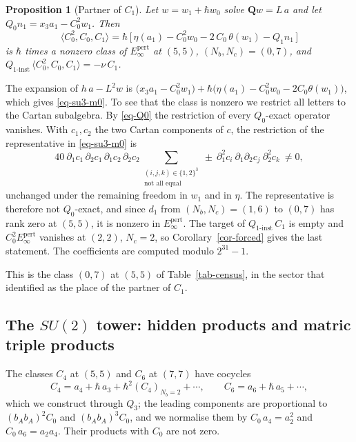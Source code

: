 \documentclass[11pt]{article}
\numberwithin{equation}{section}
\numberwithin{figure}{section}
\numberwithin{table}{section}
\newtheorem{proposition}[theorem]{Proposition}
\theoremstyle{definition}
\newcommand{\Qp}{\mathbf Q}
\newcommand{\Qi}{Q_{1\text{-}\mathrm{inst}}}
\newcommand{\Ep}{E_\infty^{\mathrm{pert}}}
\begin{document}
\begin{proposition}[Partner of $C_1$]\label{prop-C1}
Let $w=w_1+\hbar w_0$ solve $\Qp w=L\,a$ and let $Q_0n_1=x_3a_1-C_0^2w_1$. Then
\begin{equation}\label{eq-su3-m0}
\langle C_0^2,C_0,C_1\rangle=\hbar\,\big[\,\eta(a_1)-C_0^2w_0-2\,C_0\,\theta(w_1)-Q_1n_1\,\big]
\end{equation}
is $\hbar$ times a nonzero class of $\Ep$ at $(5,5)$, $(N_b,N_c)=(0,7)$, and $\Qi\,\langle C_0^2,C_0,C_1\rangle=-\nu\,C_1$.
\end{proposition}

\begin{proofbox}
The expansion of $h\,a-L^2w$ is $\big(x_3a_1-C_0^2w_1\big)+\hbar\big(\eta(a_1)-C_0^2w_0-2C_0\theta(w_1)\big)$, which gives \eqref{eq-su3-m0}. To see that the class is nonzero we restrict all letters to the Cartan subalgebra. By \eqref{eq-Q0} the restriction of every $Q_0$-exact operator vanishes. With $c_1,c_2$ the two Cartan components of $c$, the restriction of the representative in \eqref{eq-su3-m0} is
\begin{equation}\label{eq-su3-cartan}
40\ \partial_1c_1\,\partial_2c_1\,\partial_1c_2\,\partial_2c_2\!\!\sum_{\substack{(i,j,k)\in\{1,2\}^3\\ \text{not all equal}}}\!\!\pm\ \partial_1^2c_i\ \partial_1\partial_2c_j\ \partial_2^2c_k\ \neq0 ,
\end{equation}
unchanged under the remaining freedom in $w_1$ and in $\eta$. The representative is therefore not $Q_0$-exact, and since $d_1$ from $(N_b,N_c)=(1,6)$ to $(0,7)$ has rank zero at $(5,5)$, it is nonzero in $\Ep$. The target of $\Qi\,C_1$ is empty and $C_0^2\Ep$ vanishes at $(2,2)$, $N_c=2$, so Corollary~\ref{cor-forced} gives the last statement. The coefficients are computed modulo $2^{31}-1$.
\end{proofbox}

This is the class $(0,7)$ at $(5,5)$ of Table~\ref{tab-census}, in the sector that \cite[Section~8]{semichiral} identified as the place of the partner of $C_1$.

\subsection{The $SU(2)$ tower: hidden products and matric triple products}\label{sec-tower}

The classes $C_4$ at $(5,5)$ and $C_6$ at $(7,7)$ have cocycles
\begin{equation}\label{eq-C4}
C_4=a_4+\hbar\,a_3+\hbar^2(C_4)_{N_b=2}+\cdots,\qquad C_6=a_6+\hbar\,a_5+\cdots,
\end{equation}
which we construct through $Q_3$; the leading components are proportional to $(b_Ab_A)^2C_0$ and $(b_Ab_A)^3C_0$, and we normalise them by $C_0\,a_4=a_2^2$ and $C_0\,a_6=a_2a_4$. Their products with $C_0$ are not zero.
\end{document}
